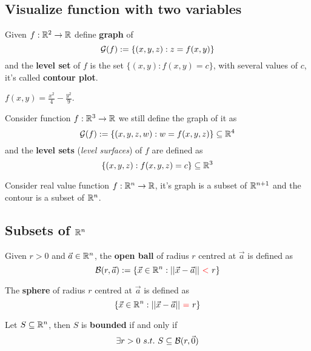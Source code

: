 \documentclass[]{article}
\begin{document}
		\subsection{Visualize function with two variables}
		\begin{definition}
			Given ${f}: {\mathbb{R}^2} \to {\mathbb{R}}$ define \textbf{graph} of 
			\[
				\mathcal{{G}}(f):=\{(x,y,z):z=f(x,y)\}
			\]
			and the \textbf{level set} of $f$ is the set $\{(x,y) : f(x,y) = c\}$, with several values of $c$, it's called \textbf{contour plot}.
		\end{definition}
		\begin{example}
			$f(x,y) = \frac{x^2}{4}-\frac{y^2}{9}$.
		\end{example}
		\begin{definition}
			Consider function ${f}: {\mathbb{R}^3} \to {\mathbb{R}}$ we still define the graph of it as 
			\[
				\mathcal{{G}}(f) := \{(x,y,z,w): w = f(x,y,z)\} \subseteq \mathbb{R}^4
			\]
			and the \textbf{level sets} (\emph{level surfaces}) of $f$ are defined as
			\[
				\{(x,y,z): f(x,y,z) = c\} \subseteq \mathbb{R}^3
			\]
		\end{definition}
		
		\begin{definition}
			Consider real value function ${f}: {\mathbb{R}^n} \to {\mathbb{R}}$, it's graph is a subset of $\mathbb{R}^{n+1}$ and the contour is a subset of $\mathbb{R}^n$.
		\end{definition}
		
		\subsection{Subsets of $\mathbb{R}^n$}
		\begin{definition}
			Given $r > 0$ and $\vec{a} \in \mathbb{R}^n$, the \textbf{open ball} of radius $r$ centred at $\vec{a}$ is defined as 
			\[
				\mc{B}(r, \vec{a}) :=
				\{\vec{x} \in \R^n: \Norm{\vec{x} - \vec{a}}\ \textcolor{red}{<}\ r\}
			\]
		\end{definition}
		
		\begin{definition}
			The \textbf{sphere} of radius $r$ centred at $\vec{a}$ is defined as 
			\[
				\{\vec{x} \in \mathbb{R}^n: \vert \vert {\vec{x} - \vec{a}} \vert \vert\ \textcolor{red}{=}\ r\}
			\]
		\end{definition}
		
		\begin{definition}
			Let $S \subseteq \mathbb{R}^n$, then $S$ is \textbf{bounded} if and only if
			\[
				\exists r > 0\ s.t.\ S \subseteq \mathcal{{B}}(r, \vec{0})
			\]
		\end{definition}
		
\end{document}
